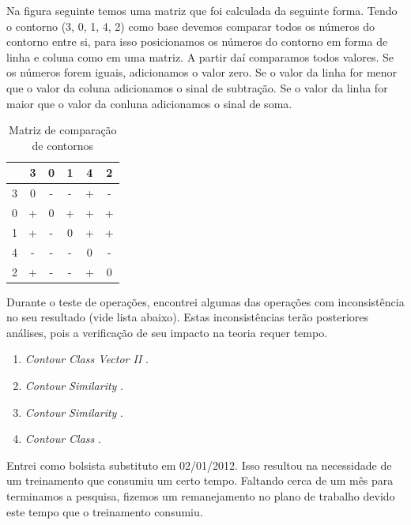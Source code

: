 \documentclass[11pt]{article}
\newcommand{\eng}[1]{\textit{#1}}
\begin{document}
Na figura seguinte temos uma matriz que foi calculada da seguinte
forma.  Tendo o contorno (3, 0, 1, 4, 2) como base devemos comparar
todos os números do contorno entre si, para isso posicionamos os
números do contorno em forma de linha e coluna como em uma matriz.
A partir daí comparamos todos valores.  Se os números forem iguais,
adicionamos o valor zero. Se o valor da linha for menor que o valor da
coluna adicionamos o sinal de subtração. Se o valor da linha for maior
que o valor da conluna adicionamos o sinal de
soma.

\begin{table}
  \centering
  \begin{tabular}{c|ccccc}
    &3&0&1&4&2\\
    \hline
    3&0&-&-&+&-\\
    0&+&0&+&+&+\\
    1&+&-&0&+&+\\
    4&-&-&-&0&-\\
    2&+&-&-&+&0\\
  \end{tabular}
  \caption{Matriz de comparação de contornos}
  \label{tab:matriz-comparacao-contornos}
\end{table}

Durante o teste de operações, encontrei algumas das operações com
inconsistência no seu resultado (vide lista abaixo). Estas inconsistências terão posteriores
análises, pois a verificação de seu impacto na teoria requer tempo.

\begin{enumerate}
\item \eng{Contour Class Vector II} \cite[p. 241]{Friedmann1985}.
\item \eng{Contour Similarity} \cite[p. 242]{Quinn1997}.
\item \eng{Contour Similarity} \cite[p. 262]{Quinn1997}.
\item \eng{Contour Class} \cite[p. 113]{Schultz2008}.
\end{enumerate}

Entrei como bolsista substituto em 02/01/2012. Isso resultou na
necessidade de um treinamento que consumiu
um certo tempo.
Faltando cerca de um mês para terminamos a pesquisa, fizemos um
remanejamento no plano de trabalho devido este tempo que o treinamento
consumiu.
\end{document}
